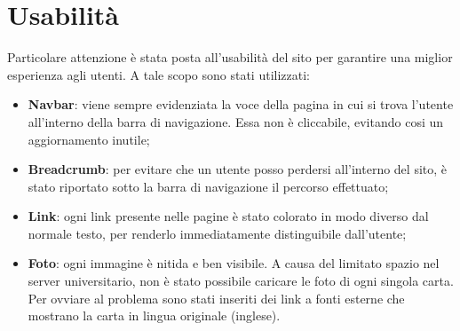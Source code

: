 \section{Usabilità}
Particolare attenzione è stata posta all'usabilità del sito per garantire una miglior esperienza agli utenti. A tale scopo sono stati utilizzati:
\begin{itemize}
	\item \textbf{Navbar}: viene sempre evidenziata la voce della pagina in cui si trova l'utente all'interno della barra di navigazione. Essa non è cliccabile, evitando cosi un aggiornamento inutile;
	\item \textbf{Breadcrumb}: per evitare che un utente posso perdersi all'interno del sito, è stato riportato sotto la barra di navigazione il percorso effettuato;
	\item \textbf{Link}: ogni link presente nelle pagine è stato colorato in modo diverso dal normale testo, per renderlo immediatamente distinguibile dall'utente;
	\item \textbf{Foto}: ogni immagine è nitida e ben visibile. A causa del limitato spazio nel server universitario, non è stato possibile caricare le foto di ogni singola carta. Per ovviare al problema sono stati inseriti dei link a fonti esterne che mostrano la carta in lingua originale (inglese).
\end{itemize}


\newpage